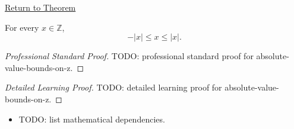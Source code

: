 \newpage
{}
\label{prf:absolute-value-bounds-on-z}

\begin{remark*}[Return]
\hyperref[thm:absolute-value-bounds-on-z]{Return to Theorem}
\end{remark*}

\begin{theorem*}
For every $x\in\mathbb{Z}$,
\[
-|x|\le x\le |x|.
\]
\end{theorem*}

\begin{proof}[Professional Standard Proof]
\LRAProofBodyStart
TODO: professional standard proof for absolute-value-bounds-on-z.
\end{proof}

\begin{proof}[Detailed Learning Proof]
\LRAProofBodyStart
TODO: detailed learning proof for absolute-value-bounds-on-z.
\end{proof}

\begin{remark*}
\end{remark*}

\begin{dependencies}
\begin{itemize}
  \item TODO: list mathematical dependencies.
\end{itemize}
\end{dependencies}

\clearpage
